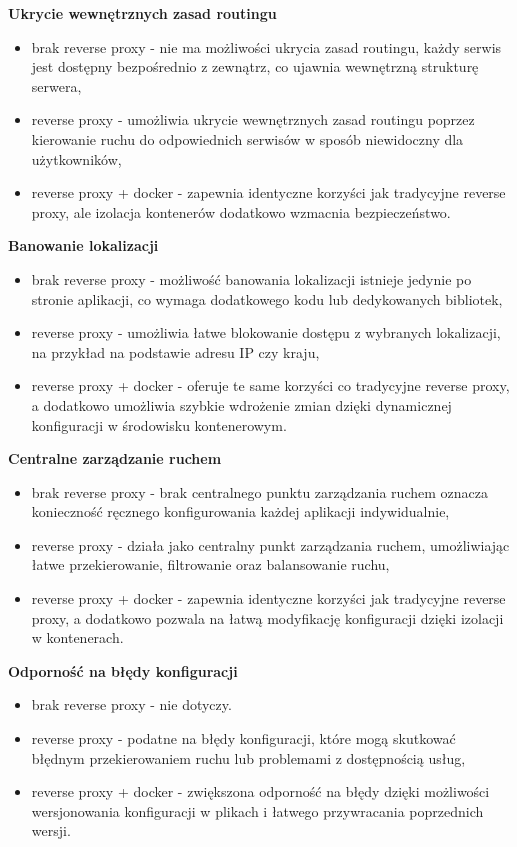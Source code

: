 \documentclass{article}
\begin{document}
\textbf{Ukrycie wewnętrznych zasad routingu}
\begin{itemize}
    \item brak reverse proxy - nie ma możliwości ukrycia zasad routingu, każdy serwis jest dostępny bezpośrednio z zewnątrz, co ujawnia wewnętrzną strukturę serwera,
    \item reverse proxy - umożliwia ukrycie wewnętrznych zasad routingu poprzez kierowanie ruchu do odpowiednich serwisów w sposób niewidoczny dla użytkowników,
    \item reverse proxy + docker - zapewnia identyczne korzyści jak tradycyjne reverse proxy, ale izolacja kontenerów dodatkowo wzmacnia bezpieczeństwo.
\end{itemize}

\textbf{Banowanie lokalizacji}
\begin{itemize}
    \item brak reverse proxy - możliwość banowania lokalizacji istnieje jedynie po stronie aplikacji, co wymaga dodatkowego kodu lub dedykowanych bibliotek,
    \item reverse proxy - umożliwia łatwe blokowanie dostępu z wybranych lokalizacji, na przykład na podstawie adresu IP czy kraju,
    \item reverse proxy + docker - oferuje te same korzyści co tradycyjne reverse proxy, a dodatkowo umożliwia szybkie wdrożenie zmian dzięki dynamicznej konfiguracji w środowisku kontenerowym.
\end{itemize}

\textbf{Centralne zarządzanie ruchem}
\begin{itemize}
    \item brak reverse proxy - brak centralnego punktu zarządzania ruchem oznacza konieczność ręcznego konfigurowania każdej aplikacji indywidualnie,
    \item reverse proxy - działa jako centralny punkt zarządzania ruchem, umożliwiając łatwe przekierowanie, filtrowanie oraz balansowanie ruchu,
    \item reverse proxy + docker - zapewnia identyczne korzyści jak tradycyjne reverse proxy, a dodatkowo pozwala na łatwą modyfikację konfiguracji dzięki izolacji w kontenerach.
\end{itemize}

\textbf{Odporność na błędy konfiguracji}
\begin{itemize}
    \item brak reverse proxy - nie dotyczy.
    \item reverse proxy - podatne na błędy konfiguracji, które mogą skutkować błędnym przekierowaniem ruchu lub problemami z dostępnością usług,
    \item reverse proxy + docker - zwiększona odporność na błędy dzięki możliwości wersjonowania konfiguracji w plikach i łatwego przywracania poprzednich wersji.
\end{itemize}
\end{document}
